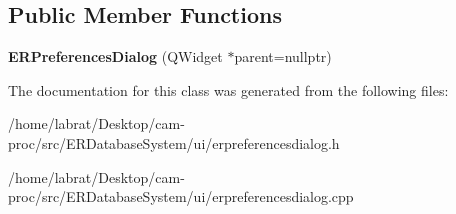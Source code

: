 \subsection*{Public Member Functions}
\begin{DoxyCompactItemize}
\item 
{\bfseries E\+R\+Preferences\+Dialog} (Q\+Widget $\ast$parent=nullptr)\hypertarget{classERPreferencesDialog_aa29da15cfbe2a357aecb79f5e06f28ee}{}\label{classERPreferencesDialog_aa29da15cfbe2a357aecb79f5e06f28ee}

\end{DoxyCompactItemize}


The documentation for this class was generated from the following files\+:\begin{DoxyCompactItemize}
\item 
/home/labrat/\+Desktop/cam-\/proc/src/\+E\+R\+Database\+System/ui/erpreferencesdialog.\+h\item 
/home/labrat/\+Desktop/cam-\/proc/src/\+E\+R\+Database\+System/ui/erpreferencesdialog.\+cpp\end{DoxyCompactItemize}
